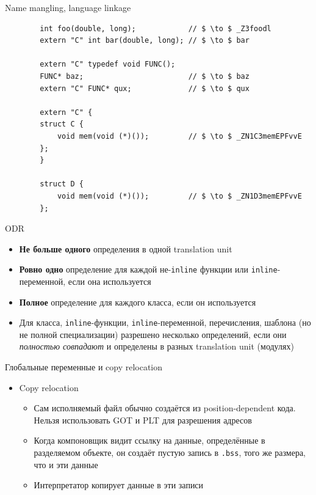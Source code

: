 \documentclass{beamer}
\begin{document}
\begin{frame}[fragile]{Name mangling, language linkage}
    \begin{verbatim}
        int foo(double, long);            // $ \to $ _Z3foodl
        extern "C" int bar(double, long); // $ \to $ bar

        extern "C" typedef void FUNC();
        FUNC* baz;                        // $ \to $ baz
        extern "C" FUNC* qux;             // $ \to $ qux

        extern "C" {
        struct C {
            void mem(void (*)());         // $ \to $ _ZN1C3memEPFvvE
        };
        }

        struct D {
            void mem(void (*)());         // $ \to $ _ZN1D3memEPFvvE
        };
    \end{verbatim}
\end{frame}

\begin{frame}{ODR}
    \begin{itemize}
        \item \textbf{Не больше одного} определения в одной translation unit
        \item \textbf{Ровно одно} определение для каждой не-\texttt{inline} функции или
            \texttt{inline}-переменной, если она используется
        \item \textbf{Полное} определение для каждого класса, если он используется
        \item Для класса, \texttt{inline}-функции, \texttt{inline}-переменной, перечисления,
            шаблона (но не полной специализации) разрешено несколько определений, если они
            \textit{полностью совпадают} и определены в разных translation unit (модулях)
    \end{itemize}
\end{frame}

\begin{frame}{Глобальные переменные и copy relocation}
    \begin{itemize}
        \item Copy relocation
            \begin{itemize}
                \item Сам исполняемый файл обычно создаётся из position-dependent кода.
                    Нельзя использовать GOT и PLT для разрешения адресов
                \item Когда компоновщик видит ссылку на данные, определённые в разделяемом объекте,
                    он создаёт пустую запись в \texttt{.bss}, того же размера, что и эти данные
                \item Интерпретатор копирует данные в эти записи
            \end{itemize}
    \end{itemize}
\end{frame}
\end{document}
